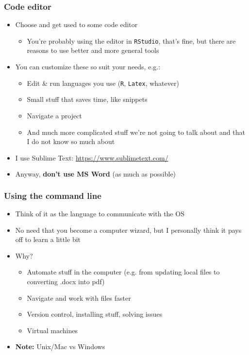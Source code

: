 \documentclass[aspectratio=43]{beamer}
\begin{document}
\begin{frame}
\frametitle{Code editor}
\centering

\begin{itemize}
  \item Choose and get used to some code editor
  \begin{itemize}
    \item You're probably using the editor in \texttt{RStudio}, that's fine, but there are reasons to use better and more general tools
  \end{itemize}
  \item You can customize these so suit your needs, e.g.:
  \begin{itemize}
    \item Edit \& run languages you use (\texttt{R}, \texttt{Latex}, whatever)
    \item Small stuff that saves time, like snippets
    \item Navigate a project
    \item And much more complicated stuff we're not going to talk about and that I do not know so much about
  \end{itemize}
  \item I use Sublime Text: \href{https://www.sublimetext.com/}{https://www.sublimetext.com/}
  \item Anyway, \textbf{don't use MS Word} (as much as possible)
\end{itemize}

\end{frame}

\begin{frame}
\frametitle{Using the command line}
\centering

\begin{itemize}
  \item Think of it as the language to communicate with the OS
  \item No need that you become a computer wizard, but I personally think it pays off to learn a little bit
  \item Why?
  \begin{itemize}
    \item Automate stuff in the computer (e.g. from updating local files to converting .docx into pdf)
    \item Navigate and work with files faster
    \item Version control, installing stuff, solving issues
    \item Virtual machines
  \end{itemize}
  \item \textbf{Note:} Unix/Mac vs Windows
\end{itemize}

\end{frame}
\end{document}

